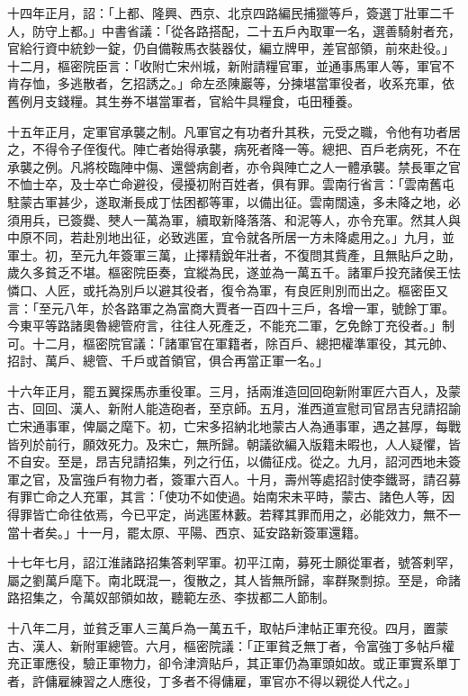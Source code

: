 \begin{pinyinscope}
 十四年正月，詔：「上都、隆興、西京、北京四路編民捕獵等戶，簽選丁壯軍二千人，防守上都。」中書省議：「從各路搭配，二十五戶內取軍一名，選善騎射者充，官給行資中統鈔一錠，仍自備鞍馬衣裝器仗，編立牌甲，差官部領，前來赴役。」十二月，樞密院臣言：「收附亡宋州城，新附請糧官軍，並通事馬軍人等，軍官不肯存恤，多逃散者，乞招誘之。」命左丞陳巖等，分揀堪當軍役者，收系充軍，依舊例月支錢糧。其生券不堪當軍者，官給牛具糧食，屯田種養。



 十五年正月，定軍官承襲之制。凡軍官之有功者升其秩，元受之職，令他有功者居之，不得令子侄復代。陣亡者始得承襲，病死者降一等。總把、百戶老病死，不在承襲之例。凡將校臨陣中傷、還營病創者，亦令與陣亡之人一體承襲。禁長軍之官不恤士卒，及士卒亡命避役，侵擾初附百姓者，俱有罪。雲南行省言：「雲南舊屯駐蒙古軍甚少，遂取漸長成丁怯困都等軍，以備出征。雲南闊遠，多未降之地，必須用兵，已簽爨、僰人一萬為軍，續取新降落落、和泥等人，亦令充軍。然其人與中原不同，若赴別地出征，必致逃匿，宜令就各所居一方未降處用之。」九月，並軍士。初，至元九年簽軍三萬，止擇精銳年壯者，不復問其貲產，且無貼戶之助，歲久多貧乏不堪。樞密院臣奏，宜縱為民，遂並為一萬五千。諸軍戶投充諸侯王怯憐口、人匠，或托為別戶以避其役者，復令為軍，有良匠則別而出之。樞密臣又言：「至元八年，於各路軍之為富商大賈者一百四十三戶，各增一軍，號餘丁軍。今東平等路諸奧魯總管府言，往往人死產乏，不能充二軍，乞免餘丁充役者。」制可。十二月，樞密院官議：「諸軍官在軍籍者，除百戶、總把權準軍役，其元帥、招討、萬戶、總管、千戶或首領官，俱合再當正軍一名。」



 十六年正月，罷五翼探馬赤重役軍。三月，括兩淮造回回砲新附軍匠六百人，及蒙古、回回、漢人、新附人能造砲者，至京師。五月，淮西道宣慰司官昂吉兒請招諭亡宋通事軍，俾屬之麾下。初，亡宋多招納北地蒙古人為通事軍，遇之甚厚，每戰皆列於前行，願效死力。及宋亡，無所歸。朝議欲編入版籍未暇也，人人疑懼，皆不自安。至是，昂吉兒請招集，列之行伍，以備征戍。從之。九月，詔河西地未簽軍之官，及富強戶有物力者，簽軍六百人。十月，壽州等處招討使李鐵哥，請召募有罪亡命之人充軍，其言：「使功不如使過。始南宋未平時，蒙古、諸色人等，因得罪皆亡命往依焉，今已平定，尚逃匿林藪。若釋其罪而用之，必能效力，無不一當十者矣。」十一月，罷太原、平陽、西京、延安路新簽軍還籍。



 十七年七月，詔江淮諸路招集答剌罕軍。初平江南，募死士願從軍者，號答剌罕，屬之劉萬戶麾下。南北既混一，復散之，其人皆無所歸，率群聚剽掠。至是，命諸路招集之，令萬奴部領如故，聽範左丞、李拔都二人節制。



 十八年二月，並貧乏軍人三萬戶為一萬五千，取帖戶津帖正軍充役。四月，置蒙古、漢人、新附軍總管。六月，樞密院議：「正軍貧乏無丁者，令富強丁多帖戶權充正軍應役，驗正軍物力，卻令津濟貼戶，其正軍仍為軍頭如故。或正軍實系單丁者，許傭雇練習之人應役，丁多者不得傭雇，軍官亦不得以親從人代之。」




\end{pinyinscope}
